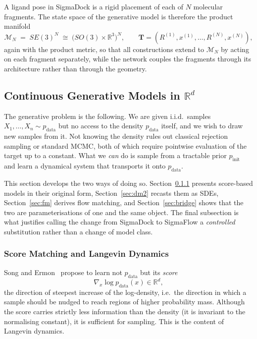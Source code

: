 \documentclass[a4paper,12pt]{article}
\theoremstyle{remark}
\begin{document}
A ligand pose in SigmaDock is a rigid placement of each of $N$ molecular fragments.
The state space of the generative model is therefore the product manifold
\[
\mathcal M_N
\;=\;
SE(3)^N
\;\cong\;
\bigl(SO(3)\times\mathbb R^3\bigr)^N,
\qquad
\mathbf T=(R^{(1)},x^{(1)},\dots,R^{(N)},x^{(N)}),
\]
again with the product metric, so that all constructions extend to $\mathcal M_N$ by
acting on each fragment separately, while the network couples the fragments through its
architecture rather than through the geometry.

\subsection{Continuous Generative Models in $\mathbb{R}^d$}
\label{sec:cgm}

The generative problem is the following. We are given i.i.d.\ samples
$X_1,\dots,X_n\sim p_{\mathrm{data}}$ but no access to the density $p_{\mathrm{data}}$
itself, and we wish to draw new samples from it. Not knowing the density rules out
classical rejection sampling or standard MCMC, both of which require pointwise
evaluation of the target up to a constant. What we \emph{can} do is sample from a
tractable prior $p_{\mathrm{init}}$ and learn a dynamical system that transports it onto
$p_{\mathrm{data}}$.

This section develops the two ways of doing so. Section~\ref{sec:dm1} presents
score-based models in their original form, Section~\ref{sec:dm2} recasts them as SDEs,
Section~\ref{sec:fm} derives flow matching, and Section~\ref{sec:bridge} shows that the
two are parameterisations of one and the same object. The final subsection is what
justifies calling the change from SigmaDock to SigmaFlow a \emph{controlled}
substitution rather than a change of model class.

\subsubsection{Score Matching and Langevin Dynamics}
\label{sec:dm1}

Song and Ermon~\cite{bortoliRiemannianScoreBasedGenerative2022} propose to learn not $p_{\mathrm{data}}$ but its
\emph{score}
\[
\nabla_x\log p_{\mathrm{data}}(x)\in\mathbb R^d,
\]
the direction of steepest increase of the log-density, i.e.\ the direction in which a
sample should be nudged to reach regions of higher probability mass. Although the score
carries strictly less information than the density (it is invariant to the normalising
constant), it is sufficient for sampling. This is the content of Langevin dynamics.
\end{document}
